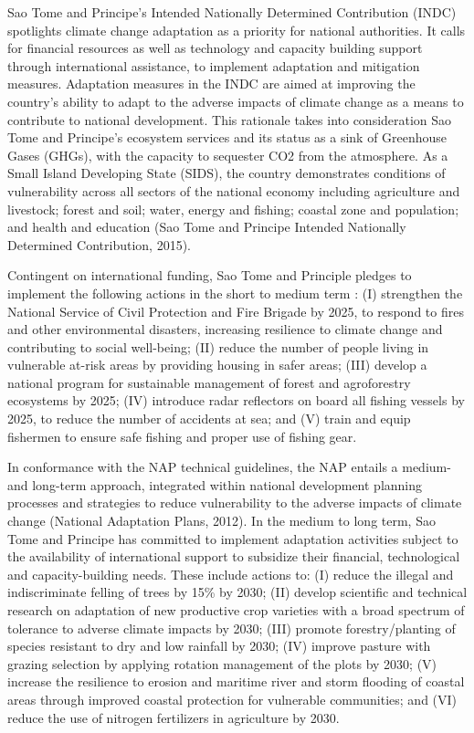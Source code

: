 \documentclass[
]{book}
\begin{document}
Sao Tome and Principe's Intended Nationally Determined Contribution (INDC) spotlights climate change adaptation as a priority for national authorities. It calls for financial resources as well as technology and capacity building support through international assistance, to implement adaptation and mitigation measures. Adaptation measures in the INDC are aimed at improving the country's ability to adapt to the adverse impacts of climate change as a means to contribute to national development. This rationale takes into consideration Sao Tome and Principe's ecosystem services and its status as a sink of Greenhouse Gases (GHGs), with the capacity to sequester CO2 from the atmosphere. As a Small Island Developing State (SIDS), the country demonstrates conditions of vulnerability across all sectors of the national economy including agriculture and livestock; forest and soil; water, energy and fishing; coastal zone and population; and health and education (Sao Tome and Principe Intended Nationally Determined Contribution, 2015).

Contingent on international funding, Sao Tome and Principle pledges to implement the following actions in the short to medium term : (I) strengthen the National Service of Civil Protection and Fire Brigade by 2025, to respond to fires and other environmental disasters, increasing resilience to climate change and contributing to social well-being; (II) reduce the number of people living in vulnerable at-risk areas by providing housing in safer areas; (III) develop a national program for sustainable management of forest and agroforestry ecosystems by 2025; (IV) introduce radar reflectors on board all fishing vessels by 2025, to reduce the number of accidents at sea; and (V) train and equip fishermen to ensure safe fishing and proper use of fishing gear.

In conformance with the NAP technical guidelines, the NAP entails a medium- and long-term approach, integrated within national development planning processes and strategies to reduce vulnerability to the adverse impacts of climate change (National Adaptation Plans, 2012). In the medium to long term, Sao Tome and Principe has committed to implement adaptation activities subject to the availability of international support to subsidize their financial, technological and capacity-building needs. These include actions to: (I) reduce the illegal and indiscriminate felling of trees by 15\% by 2030; (II) develop scientific and technical research on adaptation of new productive crop varieties with a broad spectrum of tolerance to adverse climate impacts by 2030; (III) promote forestry/planting of species resistant to dry and low rainfall by 2030; (IV) improve pasture with grazing selection by applying rotation management of the plots by 2030; (V) increase the resilience to erosion and maritime river and storm flooding of coastal areas through improved coastal protection for vulnerable communities; and (VI) reduce the use of nitrogen fertilizers in agriculture by 2030.
\end{document}
